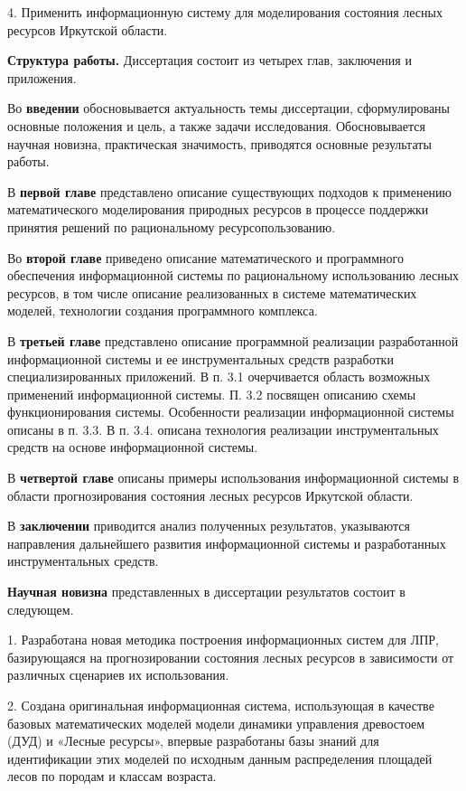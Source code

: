 \documentclass{article}
\begin{document}
4. Применить информационную систему для моделирования 
состояния лесных ресурсов Иркутской области.

\textbf{Структура работы.} Диссертация состоит 
из четырех глав, заключения и приложения. 

Во \textbf{введении} обосновывается актуальность 
темы диссертации, сформулированы основные 
положения и цель, а также задачи исследования. 
Обосновывается научная  новизна, практическая 
значимость, приводятся основные результаты 
работы.

В \textbf{первой главе} представлено описание существующих 
подходов к применению математического моделирования 
природных ресурсов в процессе поддержки принятия 
решений по рациональному ресурсопользованию.

Во \textbf{второй главе} приведено описание математического 
и программного обеспечения информационной 
системы по рациональному использованию лесных 
ресурсов, в том числе описание реализованных 
в системе математических моделей, технологии 
создания программного комплекса.

В \textbf{третьей главе} представлено описание 
программной реализации разработанной информационной 
системы и ее инструментальных средств разработки 
специализированных приложений. В п. 3.1 очерчивается 
область возможных применений информационной 
системы. П. 3.2 посвящен описанию схемы функционирования 
системы. Особенности реализации информационной 
системы описаны в п. 3.3. В п. 3.4. описана технология 
реализации инструментальных средств на основе 
информационной системы.

В \textbf{четвертой главе} описаны примеры использования 
информационной системы в области прогнозирования 
состояния лесных ресурсов Иркутской области.

В \textbf{заключении} приводится анализ полученных 
результатов, указываются направления дальнейшего 
развития информационной системы и разработанных 
инструментальных средств.

\textbf{Научная новизна }представленных в диссертации 
результатов состоит в следующем.

1. Разработана новая методика построения информационных 
систем для ЛПР, базирующаяся на прогнозировании 
состояния лесных ресурсов в зависимости от 
различных сценариев их использования. 

2. Создана оригинальная информационная система, 
использующая в качестве базовых математических 
моделей модели динамики управления древостоем 
(ДУД) и «Лесные ресурсы», впервые разработаны 
базы знаний для идентификации этих моделей 
по исходным данным распределения площадей 
лесов по породам и классам возраста. 
\end{document}
